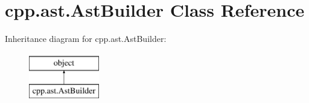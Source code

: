 \hypertarget{classcpp_1_1ast_1_1AstBuilder}{}\section{cpp.\+ast.\+Ast\+Builder Class Reference}
\label{classcpp_1_1ast_1_1AstBuilder}
Inheritance diagram for cpp.\+ast.\+Ast\+Builder\+:\begin{figure}[H]
\begin{center}
\leavevmode
\includegraphics[height=2.000000cm]{classcpp_1_1ast_1_1AstBuilder}
\end{center}
\end{figure}
